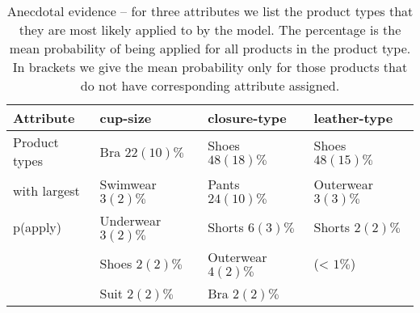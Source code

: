 \documentclass{article}
\begin{document}


\begin{table}[htbp]
  \small
\caption{\label{tab:orgdc754d7}\small
Anecdotal evidence -- for three attributes we list the product types that they are most likely applied to by the model. The percentage is the mean probability of being applied for all products in the product type. In brackets we give the mean probability only for those products that do not have corresponding attribute assigned.}
\centering
\begin{tabular}{l|lll|}
Attribute & cup-size & closure-type & leather-type\\
\hline
Product types & Bra \(22 (10) \%\) & Shoes \(48 (18) \%\) & Shoes \(48 (15)\%\)\\
with largest & Swimwear \(3 (2) \%\) & Pants \(24 (10) \%\) & Outerwear \(3 (3)\%\)\\
p(apply) & Underwear \(3 (2) \%\) & Shorts \(6 (3) \%\) & Shorts \(2(2)\%\)\\
 & Shoes \(2 (2) \%\) & Outerwear \(4 (2) \%\) & (< \(1\%\))\\
 & Suit \(2 (2) \%\) & Bra \(2 (2)\%\) & \\
\end{tabular}
\end{table}
\end{document}
